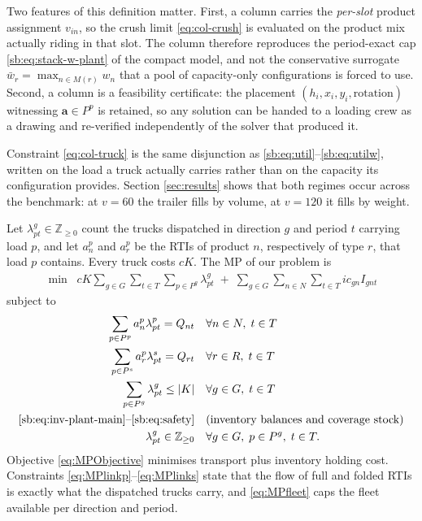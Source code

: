 Two features of this definition matter. First, a column carries the
\emph{per-slot} product assignment $v_{in}$, so the crush limit
\eqref{eq:col-crush} is evaluated on the product mix actually riding
in that slot. The column therefore reproduces the period-exact cap
\eqref{sb:eq:stack-w-plant} of the compact model, and not the
conservative surrogate $\bar w_{r}=\max_{n\in M(r)}w_{n}$ that a pool
of capacity-only configurations is forced to use. Second, a column is
a feasibility certificate: the placement
$(h_{i},x_{i},y_{i},\text{rotation})$ witnessing
$\mathbf{a}\in P^{p}$ is retained, so any solution can be handed to a
loading crew as a drawing and re-verified independently of the solver
that produced it.

Constraint \eqref{eq:col-truck} is the same disjunction as
\eqref{sb:eq:util}--\eqref{sb:eq:utilw}, written on the load a truck
actually carries rather than on the capacity its configuration
provides. Section \ref{sec:results} shows that both regimes occur
across the benchmark: at $v=60$ the trailer fills by volume, at
$v=120$ it fills by weight.

Let $\lambda^{g}_{pt}\in\mathbb{Z}_{\ge0}$ count the trucks
dispatched in direction $g$ and period $t$ carrying load $p$, and let
$a^{p}_{n}$ and $a^{p}_{r}$ be the RTIs of product $n$, respectively
of type $r$, that load $p$ contains. Every truck costs $cK$. The MP
of our problem is
\begin{align}
    \min\;\; cK \sum_{g\in G}\sum_{t\in T}\sum_{p\in P^{g}}\lambda^{g}_{pt}
    \;+\;\sum_{g\in G}\sum_{n\in N}\sum_{t\in T} ic_{gn} I_{gnt}
    \label{eq:MPObjective}
\end{align}
subject to
\begin{align}
    \sum_{p\in P^{p}} a^{p}_{n}\lambda^{p}_{pt} = Q_{nt}
      \quad & \forall n\in N,\;t\in T \label{eq:MPlinkp}\\
    \sum_{p\in P^{s}} a^{p}_{r}\lambda^{s}_{pt} = Q_{rt}
      \quad & \forall r\in R,\;t\in T \label{eq:MPlinks}\\
    \sum_{p\in P^{g}} \lambda^{g}_{pt} \le |K|
      \quad & \forall g\in G,\;t\in T \label{eq:MPfleet}\\
    \text{\eqref{sb:eq:inv-plant-main}--\eqref{sb:eq:safety}}
      \quad & \text{(inventory balances and coverage stock)}
      \nonumber\\
    \lambda^{g}_{pt}\in\mathbb{Z}_{\ge0}
      \quad & \forall g\in G,\;p\in P^{g},\;t\in T. \nonumber
\end{align}
Objective \eqref{eq:MPObjective} minimises transport plus inventory
holding cost. Constraints
\eqref{eq:MPlinkp}--\eqref{eq:MPlinks} state that the flow of full
and folded RTIs is exactly what the dispatched trucks carry, and
\eqref{eq:MPfleet} caps the fleet available per direction and period.

